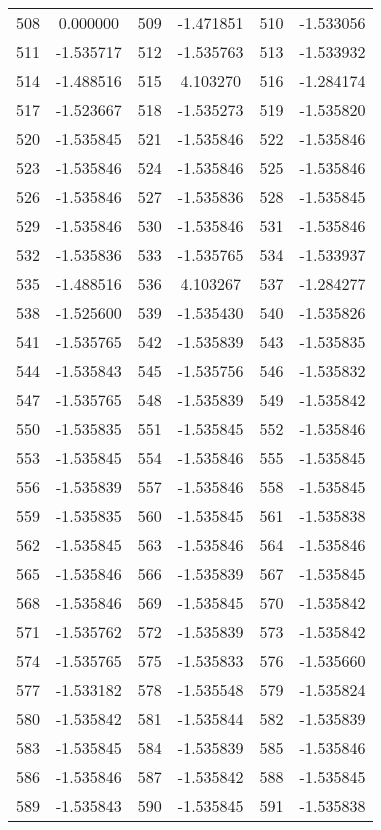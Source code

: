 \documentclass[12pt]{article}
\begin{document}
\begin{longtable}{@{}cc|cc|cc@{}}
508 & 0.000000 & 509 & -1.471851 & 510 & -1.533056 \\
511 & -1.535717 & 512 & -1.535763 & 513 & -1.533932 \\
514 & -1.488516 & 515 & 4.103270 & 516 & -1.284174 \\
517 & -1.523667 & 518 & -1.535273 & 519 & -1.535820 \\
520 & -1.535845 & 521 & -1.535846 & 522 & -1.535846 \\
523 & -1.535846 & 524 & -1.535846 & 525 & -1.535846 \\
526 & -1.535846 & 527 & -1.535836 & 528 & -1.535845 \\
529 & -1.535846 & 530 & -1.535846 & 531 & -1.535846 \\
532 & -1.535836 & 533 & -1.535765 & 534 & -1.533937 \\
535 & -1.488516 & 536 & 4.103267 & 537 & -1.284277 \\
538 & -1.525600 & 539 & -1.535430 & 540 & -1.535826 \\
541 & -1.535765 & 542 & -1.535839 & 543 & -1.535835 \\
544 & -1.535843 & 545 & -1.535756 & 546 & -1.535832 \\
547 & -1.535765 & 548 & -1.535839 & 549 & -1.535842 \\
550 & -1.535835 & 551 & -1.535845 & 552 & -1.535846 \\
553 & -1.535845 & 554 & -1.535846 & 555 & -1.535845 \\
556 & -1.535839 & 557 & -1.535846 & 558 & -1.535845 \\
559 & -1.535835 & 560 & -1.535845 & 561 & -1.535838 \\
562 & -1.535845 & 563 & -1.535846 & 564 & -1.535846 \\
565 & -1.535846 & 566 & -1.535839 & 567 & -1.535845 \\
568 & -1.535846 & 569 & -1.535845 & 570 & -1.535842 \\
571 & -1.535762 & 572 & -1.535839 & 573 & -1.535842 \\
574 & -1.535765 & 575 & -1.535833 & 576 & -1.535660 \\
577 & -1.533182 & 578 & -1.535548 & 579 & -1.535824 \\
580 & -1.535842 & 581 & -1.535844 & 582 & -1.535839 \\
583 & -1.535845 & 584 & -1.535839 & 585 & -1.535846 \\
586 & -1.535846 & 587 & -1.535842 & 588 & -1.535845 \\
589 & -1.535843 & 590 & -1.535845 & 591 & -1.535838 \\

\end{longtable}
\end{document}
